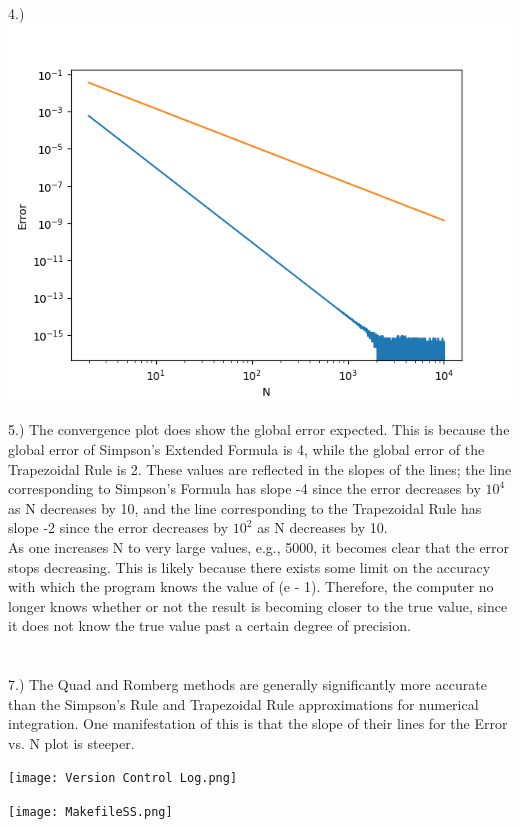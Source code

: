 \documentclass{article}
\begin{document}
\\
\\
4.) \\
\includegraphics[width=\textwidth]{Ph20_Set2_Plot.png}

5.) The convergence plot does show the global error expected. This is because the global error of Simpson's Extended Formula is 4, while the global error of the Trapezoidal Rule is 2. These values are reflected in the slopes of the lines; the line corresponding to Simpson's Formula has slope -4 since the error decreases by $10^4$ as N decreases by 10, and the line corresponding to the Trapezoidal Rule has slope -2 since the error decreases by $10^2$ as N decreases by 10. \\
As one increases N to very large values, e.g., 5000, it becomes clear that the error stops decreasing. This is likely because there exists some limit on the accuracy with which the program knows the value of (e - 1). Therefore, the computer no longer knows whether or not the result is becoming closer to the true value, since it does not know the true value past a certain degree of precision. \\
\\
\\
7.) The Quad and Romberg methods are generally significantly more accurate than the Simpson's Rule and Trapezoidal Rule approximations for numerical integration. One manifestation of this is that the slope of their lines for the Error vs. N plot is steeper. 

\texttt{[image: Version Control Log.png]}

\texttt{[image: MakefileSS.png]}
\end{document}
